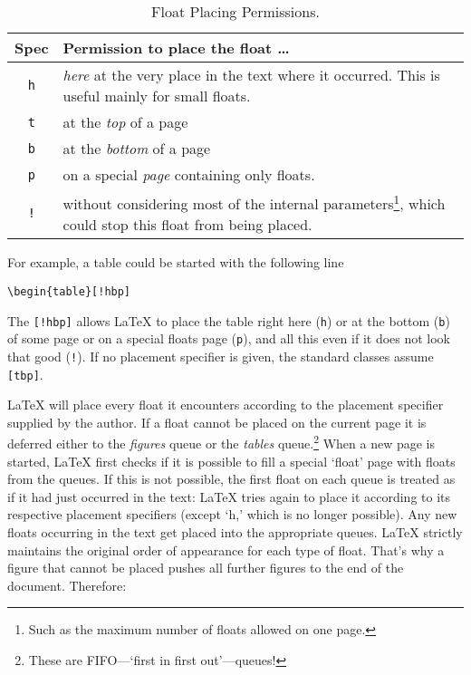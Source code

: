 \begin{table}[!bp]
\caption{Float Placing Permissions.}\label{tab:permiss}
\noindent \begin{minipage}{\textwidth}
\medskip
\begin{center}
\begin{tabular}{@{}cp{8cm}@{}}
Spec&Permission to place the float \ldots\\
\hline
\rule{0pt}{1.05em}\texttt{h} & \emph{here} at the very place in the text
  where it occurred.  This is useful mainly for small floats.\\[0.3ex]
\texttt{t} & at the \emph{top} of a page\\[0.3ex]
\texttt{b} & at the \emph{bottom} of a page\\[0.3ex]
\texttt{p} & on a special \emph{page} containing only floats.\\[0.3ex]
\texttt{!} & without considering most of the  internal parameters\footnote{Such as the
    maximum number of floats allowed  on one page.}, which could stop this
  float from being placed.
\end{tabular}
\end{center}
\end{minipage}
\end{table}

For example, a table could be started with the following line
\begin{code}
\verb|\begin{table}[!hbp]|
\end{code}
\noindent The  \verb|[!hbp]| allows \LaTeX{} to 
place the table right here (\texttt{h}) or at the bottom (\texttt{b}) 
of some page
or on a special floats page (\texttt{p}), and all this even if it does not
look that good (\texttt{!}). If no placement specifier is given, the standard
classes assume \verb|[tbp]|.

\LaTeX{} will place every float it encounters according to the
placement specifier supplied by the author. If a float cannot be
placed on the current page it is deferred either to the
\emph{figures} queue or the \emph{tables} queue.\footnote{These are FIFO---`first in first out'---queues!}  When a new page is started,
\LaTeX{} first checks if it is possible to fill a special `float'
page with floats from the queues. If this is not possible, the first
float on each queue is treated as if it had just occurred in the
text: \LaTeX{} tries again to place it according to its
respective placement specifiers (except `h,' which is no longer
possible).  Any new floats occurring in the text get placed into the
appropriate queues. \LaTeX{} strictly maintains the original order of
appearance for each type of float. That's why a figure that cannot
be placed pushes all further figures to the end of the document.
Therefore:

